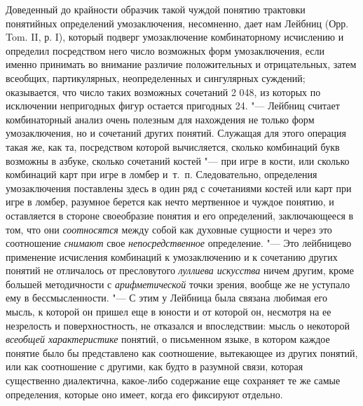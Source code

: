 {{Доведенный до крайности образчик такой чуждой понятию
трактовки понятийных определений умозаключения, несомненно, дает нам Лейбниц
(Орр. Tom. II, р. I), который подверг умозаключение
комбинаторному исчислению и определил посредством него число возможных форм
умозаключения, если именно принимать во внимание различие положительных и
отрицательных, затем всеобщих, партикулярных, неопределенных и сингулярных
суждений; оказывается, что число таких возможных сочетаний 2 048, из
которых по исключении непригодных фигур остается пригодных 24. "---
Лейбниц считает комбинаторный анализ очень полезным для
нахождения не только форм умозаключения, но и сочетаний других понятий.
Служащая для этого операция такая же, как та, посредством которой
вычисляется, сколько комбинаций букв возможны в азбуке, сколько сочетаний
костей "--- при игре в кости, или сколько комбинаций карт при
игре в ломбер и~т.~п. Следовательно, определения умозаключения поставлены
здесь в один ряд с сочетаниями костей или карт при игре в ломбер, разумное
берется как нечто мертвенное и чуждое понятию, и оставляется в стороне
своеобразие понятия и его определений, заключающееся в том, что они
{\em соотносятся} между
собой как духовные сущности и через это соотношение
{\em снимают} свое
{\em непосредственное}
определение. "--- Это лейбницево
применение исчисления комбинаций к умозаключению и к сочетанию других
понятий не отличалось от пресловутого
{\em луллиева искусства}
ничем другим, кроме большей методичности с
{\em арифметической}
точки зрения, вообще же не уступало ему в бессмысленности. "---
С этим у Лейбница была связана любимая его мысль, к которой
он пришел еще в юности и от которой он, несмотря на ее незрелость и
поверхностность, не отказался и впоследствии: мысль о некоторой
{\em всеобщей характеристике}
понятий, о письменном языке, в котором каждое понятие было бы
представлено как соотношение, вытекающее из других понятий, или как
соотношение с другими, как будто в разумной связи, которая существенно
диалектична, какое-либо содержание еще сохраняет те же самые определения,
которые оно имеет, когда его фиксируют отдельно.

}}
